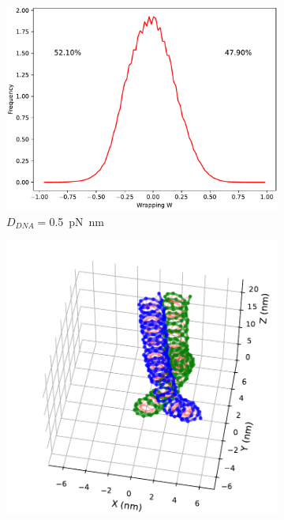 \documentclass[a4paper,10pt]{article}
\begin{document}
\begin{figure}[htbp]
\begin{subfigure}{.3\textwidth}
\includegraphics[width=\textwidth]{brD_5_br_pr.pdf}
\caption{$D_{DNA}=$\SI{0.5}{\pico\newton\nano\meter}}
\label{fig:braD_a}
\end{subfigure}
\begin{subfigure}{.3\textwidth}
\includegraphics[width=\textwidth]{brD_100_2000000.pdf}

\end{subfigure}
\end{figure}
\end{document}
